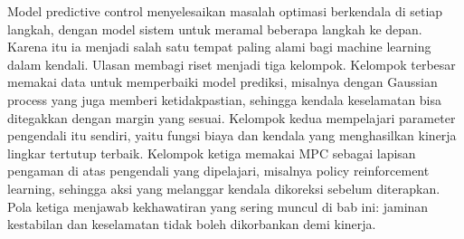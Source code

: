 Model predictive control menyelesaikan masalah optimasi berkendala di setiap langkah, dengan model sistem untuk meramal
beberapa langkah ke depan. Karena itu ia menjadi salah satu tempat paling alami bagi machine learning dalam kendali.
Ulasan \citet{hewing2020} membagi riset  menjadi tiga kelompok. Kelompok terbesar memakai data
untuk memperbaiki model prediksi, misalnya dengan Gaussian process yang juga memberi ketidakpastian, sehingga kendala
keselamatan bisa ditegakkan dengan margin yang sesuai. Kelompok kedua mempelajari parameter pengendali itu sendiri, yaitu
fungsi biaya dan kendala yang menghasilkan kinerja lingkar tertutup terbaik. Kelompok ketiga memakai MPC sebagai lapisan
pengaman di atas pengendali yang dipelajari, misalnya policy reinforcement learning, sehingga aksi yang melanggar kendala
dikoreksi sebelum diterapkan. Pola ketiga menjawab kekhawatiran yang sering muncul di bab ini: jaminan kestabilan dan
keselamatan tidak boleh dikorbankan demi kinerja.

